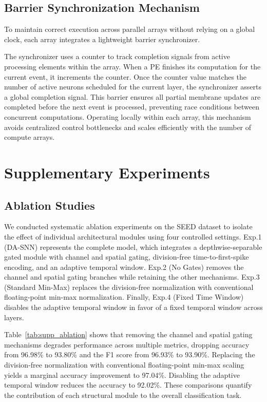 \documentclass[12pt]{article}
\begin{document}
\subsection{Barrier Synchronization Mechanism}

To maintain correct execution across parallel arrays without relying on a global clock, each array integrates a lightweight barrier synchronizer.

The synchronizer uses a counter to track completion signals from active processing elements within the array. When a PE finishes its computation for the current event, it increments the counter. Once the counter value matches the number of active neurons scheduled for the current layer, the synchronizer asserts a global completion signal. This barrier ensures all partial membrane updates are completed before the next event is processed, preventing race conditions between concurrent computations. Operating locally within each array, this mechanism avoids centralized control bottlenecks and scales efficiently with the number of compute arrays.
\section{Supplementary Experiments}

\subsection{Ablation Studies}

We conducted systematic ablation experiments on the SEED dataset to isolate the effect of individual architectural modules using four controlled settings. Exp.1 (DA-SNN) represents the complete model, which integrates a depthwise-separable gated module with channel and spatial gating, division-free time-to-first-spike encoding, and an adaptive temporal window. Exp.2 (No Gates) removes the channel and spatial gating branches while retaining the other mechanisms. Exp.3 (Standard Min-Max) replaces the division-free normalization with conventional floating-point min-max normalization. Finally, Exp.4 (Fixed Time Window) disables the adaptive temporal window in favor of a fixed temporal window across layers.

Table~\ref{tab:supp_ablation} shows that removing the channel and spatial gating mechanisms degrades performance across multiple metrics, dropping accuracy from 96.98\% to 93.80\% and the F1 score from 96.93\% to 93.90\%. Replacing the division-free normalization with conventional floating-point min-max scaling yields a marginal accuracy improvement to 97.04\%. Disabling the adaptive temporal window reduces the accuracy to 92.02\%. These comparisons quantify the contribution of each structural module to the overall classification task.
\end{document}
